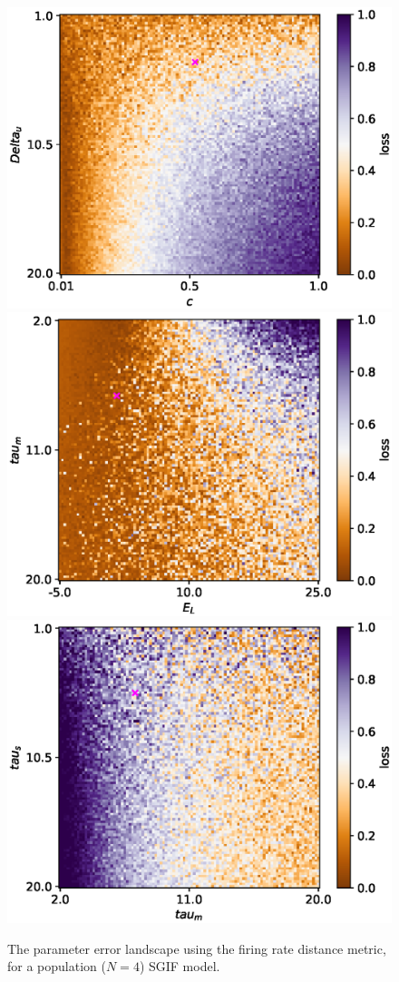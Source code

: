 \documentclass[mphil,deptreport,ianc]{infthesis} %
\begin{document}
\begin{figure}
    \centering
    \vskip -0.1in
    \includegraphics[width=0.7\columnwidth]{figures/param_landscape_heatmaps/microGIF/test_export_2d_heatmap_N_4_loss_c_Delta_u.eps}
    \includegraphics[width=0.7\columnwidth]{figures/param_landscape_heatmaps/microGIF/test_export_2d_heatmap_N_4_loss_E_L_tau_m.eps}
    \includegraphics[width=0.7\columnwidth]{figures/param_landscape_heatmaps/microGIF/test_export_2d_heatmap_N_4_loss_tau_m_tau_s.eps}
    \vskip -0.1in
    \caption{The parameter error landscape using the firing rate distance metric, for a population ($N=4$) SGIF model.}
    \label{fig:p_landscape_hmap_SGIF}
\end{figure}
\end{document}

